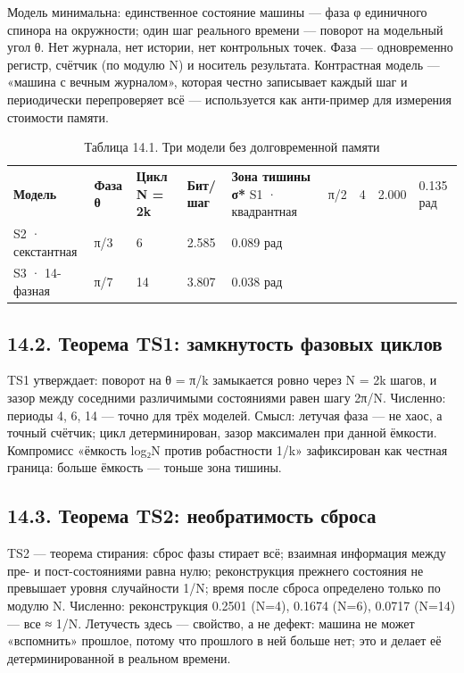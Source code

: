 \documentclass[11pt,a4paper]{article}
\begin{document}
Модель минимальна: единственное состояние машины — фаза φ единичного спинора на окружности; один шаг реального времени — поворот на модельный угол θ. Нет журнала, нет истории, нет контрольных точек. Фаза — одновременно регистр, счётчик (по модулю N) и носитель результата. Контрастная модель — «машина с вечным журналом», которая честно записывает каждый шаг и периодически перепроверяет всё — используется как анти-пример для измерения стоимости памяти.

\begin{table}[htbp]\centering\small
\caption{Таблица 14.1. Три модели без долговременной памяти}
\begin{tabular}{p{} p{} p{} p{} p{}}
\toprule
\textbf{Модель} & \textbf{Фаза θ} & \textbf{Цикл N = 2k} & \textbf{Бит/шаг} & \textbf{Зона тишины σ*}
\midrule
S1 · квадрантная & π/2 & 4 & 2.000 & 0.135 рад \\
S2 · секстантная & π/3 & 6 & 2.585 & 0.089 рад \\
S3 · 14-фазная & π/7 & 14 & 3.807 & 0.038 рад \\
\bottomrule
\end{tabular}
\end{table}

\subsection{14.2. Теорема TS1: замкнутость фазовых циклов}

TS1 утверждает: поворот на θ = π/k замыкается ровно через N = 2k шагов, и зазор между соседними различимыми состояниями равен шагу 2π/N. Численно: периоды 4, 6, 14 — точно для трёх моделей. Смысл: летучая фаза — не хаос, а точный счётчик; цикл детерминирован, зазор максимален при данной ёмкости. Компромисс «ёмкость log₂N против робастности 1/k» зафиксирован как честная граница: больше ёмкость — тоньше зона тишины.

\subsection{14.3. Теорема TS2: необратимость сброса}

TS2 — теорема стирания: сброс фазы стирает всё; взаимная информация между пре- и пост-состояниями равна нулю; реконструкция прежнего состояния не превышает уровня случайности 1/N; время после сброса определено только по модулю N. Численно: реконструкция 0.2501 (N=4), 0.1674 (N=6), 0.0717 (N=14) — все ≈ 1/N. Летучесть здесь — свойство, а не дефект: машина не может «вспомнить» прошлое, потому что прошлого в ней больше нет; это и делает её детерминированной в реальном времени.
\end{document}
